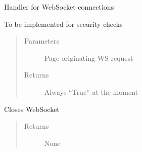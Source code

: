 \documentclass[letterpaper,10pt,english]{sphinxmanual}
\begin{document}

\begin{fulllineitems}
\label{\detokenize{funcs:backend.FitsHandler}}
\end{fulllineitems}


\begin{fulllineitems}
\label{\detokenize{funcs:backend.SocketHandler}}
Handler for WebSocket connections

\begin{fulllineitems}
\label{\detokenize{funcs:backend.SocketHandler.check_origin}}
To be implemented for security checks
\begin{quote}\begin{description}
\item[{Parameters}] \leavevmode
{} \textendash{} Page originating WS request

\item[{Returns}] \leavevmode
Always “True” at the moment

\end{description}\end{quote}

\end{fulllineitems}


\begin{fulllineitems}
\label{\detokenize{funcs:backend.SocketHandler.on_close}}
Closes WebSocket
\begin{quote}\begin{description}
\item[{Returns}] \leavevmode
None


\end{description}
\end{quote}
\end{fulllineitems}
\end{fulllineitems}
\end{document}
